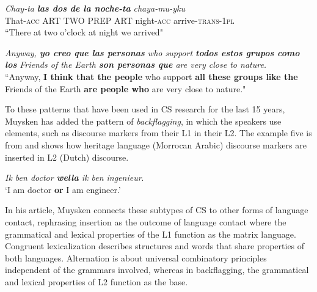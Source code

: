 \documentclass[output=paper,
modfonts
]{langscibook}
\begin{document}
\begin{exe}
\label{insertion}
\ex 
\gll \textit{Chay-ta} \textit\textbf{{las dos de la noche}-ta} \textit{chaya-mu-yku}\\
 That-\textsc{acc} \textsc{ART TWO PREP ART} night-\textsc{acc} arrive-\textsc{trans}-\textsc{1pl}\\
\trans “There at two o'clock at night we arrived"
\
\end{exe}

\begin{exe}
\label{congruent}
\begin{ex}
\textit {Anyway, \textbf{yo creo que las personas} who support \textbf{todos estos grupos como los} Friends of the Earth \textbf {son personas que} are very close to nature.}\\
“Anyway, \textbf{I think that the people} who support \textbf{all these groups like the} Friends of the Earth \textbf{are people who} are very close to nature."
\end{ex}
\end{exe}

To these patterns that have been used in CS research for the last 15 years, Muysken has added the pattern of \textit{backflagging}, in which the speakers use elements, such as discourse markers from their L1 in their L2. The example five is from \cite{muysken2013language} and shows how heritage language (Morrocan Arabic) discourse markers are inserted in L2 (Dutch) discourse. 

\begin{exe}
\label{backflagging}
\begin{ex}
\textit {Ik ben doctor \textbf{wella} ik ben ingenieur}.\\
`I am doctor \textbf{or} I am engineer.'
\end{ex}
\end{exe}

In his \citeyear{muysken2013language} article, Muysken connects these subtypes of CS to other forms of language contact, rephrasing insertion as the outcome of language contact where the grammatical and lexical properties of the L1 function as the matrix language. Congruent lexicalization describes structures and words that share properties of both languages. Alternation is about universal combinatory principles independent of the grammars involved, whereas in backflagging, the grammatical and lexical properties of L2 function as the base. \\
\end{document}
